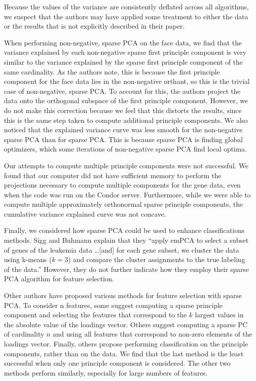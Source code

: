 \documentclass{article}
\begin{document}
Because the values of the variance are consistently deflated
across all algorithms, we suspect that the authors may have
applied some treatment to either the data or the results
that is not explicitly described in their paper.

When performing non-negative, sparse PCA on the face data,
we find that the variance explained by each non-negative
sparse first principle component is very similar to the
variance explained by the sparse first principle component
of the same cardinality.
As the authors note, this is because the first principle component
for the face data lies in the non-negative orthant, so this is the
trivial case of non-negative, sparse PCA.
To account for this, the authors project the data onto the orthogonal
subspace of the first principle component.
However, we do not make this correction because we feel that this
distorts the results, since this is the same step taken to compute
additional principle components.
We also noticed that the explained variance curve was less smooth
for the non-negative sparse PCA than for sparse PCA.
This is because sparse PCA is finding global optimizers, which
some iterations of non-negative sparse PCA find local optima.

Our attempts to compute multiple principle components were not successful.
We found that our computer did not have sufficient memory to perform the
projections necessary to compute multiple components for the gene data,
even when the code was run on the Condor server. Furthermore, while we
were able to compute multiple approximately orthonormal sparse principle
components, the cumulative variance explained curve was not concave.

Finally, we considered how sparse PCA could be used to enhance
classifications methods.
Sigg and Buhmann explain that they ``apply emPCA to select a
subset of genes of the leukemia data \ldots [and] for each gene subset,
we cluster the data using k-means ($k=3$) and compare the cluster
assignments to the true labeling of the data.''
However, they do not further indicate how they employ their
sparse PCA algorithm for feature selection.

Other authors have proposed various methods for feature selection
with sparse PCA.
To consider n features, some suggest computing a sparse principle
component and selecting the features that correspond to the $k$
largest values in the absolute value of the loadings vector.
Others suggest computing a sparse PC of cardinality $n$ and using
all features that correspond to non-zero elements of the loadings vector.
Finally, others propose performing classification on the principle
components, rather than on the data.
We find that the last method is the least successful when only one
principle component is considered.
The other two methods perform similarly, especially for large
numbers of features.
\end{document}

